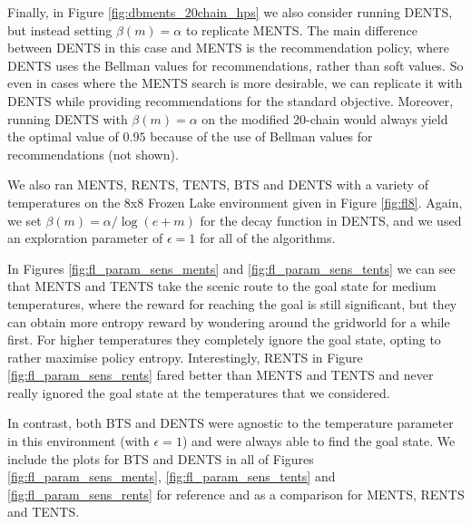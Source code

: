             Finally, in Figure \ref{fig:dbments_20chain_hps} we also consider running DENTS, but instead setting $\beta(m)=\alpha$ to replicate MENTS. The main difference between DENTS in this case and MENTS is the recommendation policy, where DENTS uses the Bellman values for recommendations, rather than soft values. So even in cases where the MENTS search is more desirable, we can replicate it with DENTS while providing recommendations for the standard objective. Moreover, running DENTS with $\beta(m)=\alpha$ on the modified 20-chain would always yield the optimal value of $0.95$ because of the use of Bellman values for recommendations (not shown).





             \label{app:param_sens_fl}
            We also ran MENTS, RENTS, TENTS, BTS and DENTS with a variety of temperatures on the 8x8 Frozen Lake environment given in Figure \ref{fig:fl8}. Again, we set $\beta(m)=\alpha/\log(e+m)$ for the decay function in DENTS, and we used an exploration parameter of $\epsilon=1$ for all of the algorithms. 

            In Figures \ref{fig:fl_param_sens_ments} and \ref{fig:fl_param_sens_tents} we can see that MENTS and TENTS take the scenic route to the goal state for medium temperatures, where the reward for reaching the goal is still significant, but they can obtain more entropy reward by wondering around the gridworld for a while first. For higher temperatures they completely ignore the goal state, opting to rather maximise policy entropy. Interestingly, RENTS in Figure \ref{fig:fl_param_sens_rents} fared better than MENTS and TENTS and never really ignored the goal state at the temperatures that we considered.

            In contrast, both BTS and DENTS were agnostic to the temperature parameter in this environment (with $\epsilon=1$) and were always able to find the goal state. We include the plots for BTS and DENTS in all of Figures \ref{fig:fl_param_sens_ments}, \ref{fig:fl_param_sens_tents} and \ref{fig:fl_param_sens_rents} for reference and as a comparison for MENTS, RENTS and TENTS.
        
            \FloatBarrier
            
